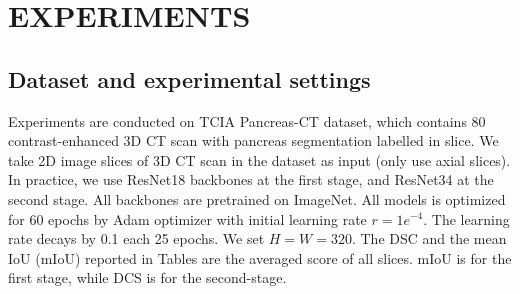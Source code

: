 \documentclass{article}
\begin{document}
\vspace{-15pt}
\section{EXPERIMENTS}
\vspace{-10pt}
\subsection{Dataset and experimental settings}
\vspace{-5pt}
Experiments are conducted on TCIA Pancreas-CT dataset\cite{TCIA}, which contains 80 contrast-enhanced 3D CT scan with pancreas segmentation labelled in slice.
We take 2D image slices of 3D CT scan in the dataset as input (only use axial slices).
In practice, we use ResNet18\cite{resnet} backbones at the first stage, and ResNet34\cite{resnet} at the second stage. All backbones are pretrained on ImageNet\cite{imagenet}.
All models is optimized for 60 epochs by Adam optimizer with initial learning rate $r=1e^{-4}$. The learning rate decays by 0.1 each 25 epochs. We set $H=W=320$. The DSC and the mean IoU (mIoU) reported in Tables are the averaged score of all slices. mIoU is for the first stage, while DCS is for the second-stage. %


\end{document}
